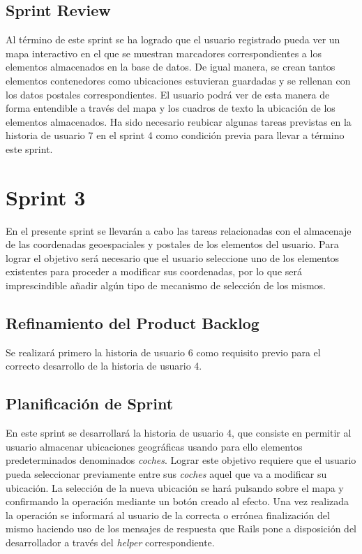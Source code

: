 	\subsection{Sprint Review}
	Al término de este sprint se ha logrado que el usuario registrado pueda ver un mapa interactivo en el que se muestran marcadores correspondientes a los elementos almacenados en la base de datos. De igual manera, se crean tantos elementos contenedores como ubicaciones estuvieran guardadas y se rellenan con los datos postales correspondientes. El usuario podrá ver de esta manera de forma entendible a través del mapa y los cuadros de texto la ubicación de los elementos almacenados. Ha sido necesario reubicar algunas tareas previstas en la historia de usuario 7 en el sprint 4 como condición previa para llevar a término este sprint.
	
\section{Sprint 3}
En el presente sprint se llevarán a cabo las tareas relacionadas con el almacenaje de las coordenadas geoespaciales y postales de los elementos del usuario. Para lograr el objetivo será necesario que el usuario seleccione uno de los elementos existentes para proceder a modificar sus coordenadas, por lo que será imprescindible añadir algún tipo de mecanismo de selección de los mismos.

	\subsection{Refinamiento del Product Backlog}
	Se realizará primero la historia de usuario 6 como requisito previo para el correcto desarrollo de la historia de usuario 4.
	
	\subsection{Planificación de Sprint}
	En este sprint se desarrollará la historia de usuario 4, que consiste en permitir al usuario almacenar ubicaciones geográficas usando para ello elementos predeterminados denominados \textit{coches}. Lograr este objetivo requiere que el usuario pueda seleccionar previamente entre sus \textit{coches} aquel que va a modificar su ubicación. La selección de la nueva ubicación se hará pulsando sobre el mapa y confirmando la operación mediante un botón creado al efecto. Una vez realizada la operación se informará al usuario de la correcta o errónea finalización del mismo haciendo uso de los mensajes de respuesta que Rails pone a disposición del desarrollador a través del \textit{helper} correspondiente.
	
